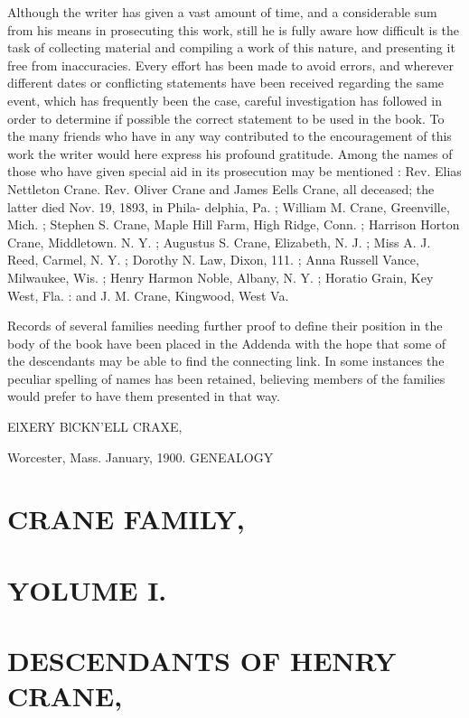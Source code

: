 \documentclass{book}
\begin{document}
Although the writer has given a vast amount of time, and a
considerable sum from his means in prosecuting this work, still
he is fully aware how difficult is the task of collecting material
and compiling a work of this nature, and presenting it free from
inaccuracies. Every effort has been made to avoid errors, and
wherever different dates or conflicting statements have been
received regarding the same event, which has frequently been
the case, careful investigation has followed in order to determine
if possible the correct statement to be used in the book. To
the many friends who have in any way contributed to the
encouragement of this work the writer would here express his
profound gratitude. Among the names of those who have
given special aid in its prosecution may be mentioned : Rev.
Elias Nettleton Crane. Rev. Oliver Crane and James Eells
Crane, all deceased; the latter died Nov. 19, 1893, in Phila-
delphia, Pa. ; William M. Crane, Greenville, Mich. ; Stephen S.
Crane, Maple Hill Farm, High Ridge, Conn. ; Harrison Horton
Crane, Middletown. N. Y. ; Augustus S. Crane, Elizabeth, N. J. ;
Miss A. J. Reed, Carmel, N. Y. ; Dorothy N. Law, Dixon, 111. ;
Anna Russell Vance, Milwaukee, Wis. ; Henry Harmon Noble,
Albany, N. Y. ; Horatio Grain, Key West, Fla. : and J. M.
Crane, Kingwood, West Va.

Records of several families needing further proof to define
their position in the body of the book have been placed in the
Addenda with the hope that some of the descendants may be
able to find the connecting link. In some instances the peculiar
spelling of names has been retained, believing members of the
families would prefer to have them presented in that way.

ElXERY BlCKN'ELL CRAXE,

Worcester, Mass.
January, 1900.
GENEALOGY 



\chapter{CRANE FAMILY,}


\chapter{YOLUME I.}


\chapter{DESCENDANTS OF HENRY CRANE,}
\end{document}
